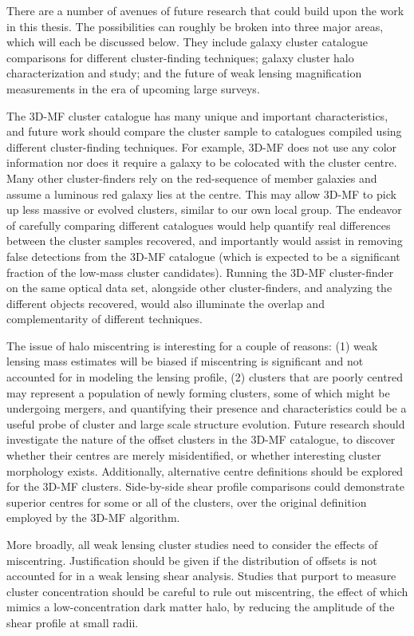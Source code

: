 There are a number of avenues of future research that could build upon the work in this thesis. The possibilities can roughly be broken into three major areas, which will each be discussed below. They include galaxy cluster catalogue comparisons for different cluster-finding techniques; galaxy cluster halo characterization and study; and the future of weak lensing magnification measurements in the era of upcoming large surveys.

The \ac{3D-MF} cluster catalogue has many unique and important characteristics, and future work should compare the cluster sample to catalogues compiled using different cluster-finding techniques. For example, \ac{3D-MF} does not use any color information nor does it require a galaxy to be colocated with the cluster centre. Many other cluster-finders rely on the red-sequence of member galaxies and assume a luminous red galaxy lies at the centre. This may allow \ac{3D-MF} to pick up less massive or evolved clusters, similar to our own local group. The endeavor of carefully comparing different catalogues would help quantify real differences between the cluster samples recovered, and importantly would assist in removing false detections from the \ac{3D-MF} catalogue (which is expected to be a significant fraction of the low-mass cluster candidates). Running the \ac{3D-MF} cluster-finder on the same optical data set, alongside other cluster-finders, and analyzing the different objects recovered, would also illuminate the overlap and complementarity of different techniques.

The issue of halo miscentring is interesting for a couple of reasons: (1) weak lensing mass estimates will be biased if miscentring is significant and not accounted for in modeling the lensing profile, (2) clusters that are poorly centred may represent a population of newly forming clusters, some of which might be undergoing mergers, and quantifying their presence and characteristics could be a useful probe of cluster and large scale structure evolution. Future research should investigate the nature of the offset clusters in the \ac{3D-MF} catalogue, to discover whether their centres are merely misidentified, or whether interesting cluster morphology exists. Additionally, alternative centre definitions should be explored for the \ac{3D-MF} clusters. Side-by-side shear profile comparisons could demonstrate superior centres for some or all of the clusters, over the original definition employed by the \ac{3D-MF} algorithm.

More broadly, all weak lensing cluster studies need to consider the effects of miscentring. Justification should be given if the distribution of offsets is not accounted for in a weak lensing shear analysis. Studies that purport to measure cluster concentration should be careful to rule out miscentring, the effect of which mimics a low-concentration dark matter halo, by reducing the amplitude of the shear profile at small radii. 


